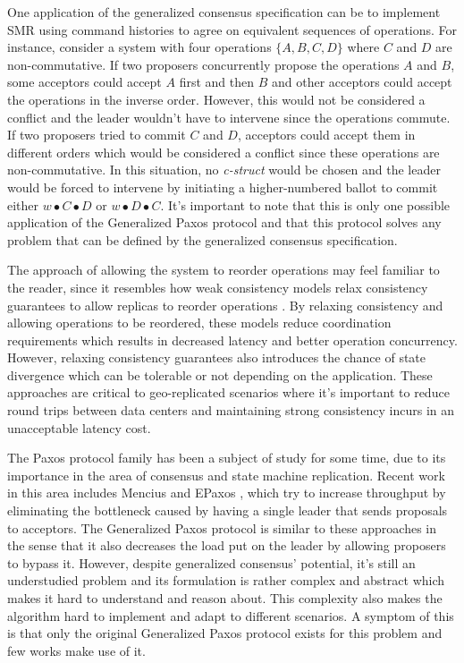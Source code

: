 \documentclass[runningheads,a4paper]{llncs}
\begin{document}
One application of the generalized consensus specification can be to implement SMR using command histories to agree on equivalent sequences of operations. For instance, consider a system with four operations $\{A, B, C, D\}$ where $C$ and $D$ are non-commutative. If two proposers concurrently propose the operations $A$ and $B$, some acceptors could accept $A$ first and then $B$ and other acceptors could accept the operations in the inverse order. However, this would not be considered a conflict and the leader wouldn't have to intervene since the operations commute. If two proposers tried to commit $C$ and $D$, acceptors could accept them in different orders which would be considered a conflict since these operations are non-commutative. In this situation, no \textit{c-struct} would be chosen and the leader would be forced to intervene by initiating a higher-numbered ballot to commit either $w \bullet C \bullet D$ or $w \bullet D \bullet C$. It's important to note that this is only one possible application of the Generalized Paxos protocol and that this protocol solves any problem that can be defined by the generalized consensus specification. \par
The approach of allowing the system to reorder operations may feel familiar to the reader, since it resembles how weak consistency models relax consistency guarantees to allow replicas to reorder operations \cite{Ladin1992}. By relaxing consistency and allowing operations to be reordered, these models reduce coordination requirements which results in decreased latency and better operation concurrency. However, relaxing consistency guarantees also introduces the chance of state divergence which can be tolerable or not depending on the application. These approaches are critical to geo-replicated scenarios where it's important to reduce round trips between data centers and maintaining strong consistency incurs in an unacceptable latency cost. \par
The Paxos protocol family has been a subject of study for some time, due to its importance in the area of consensus and state machine replication. Recent work in this area includes Mencius \cite{Mao2008} and EPaxos \cite{Moraru2013}, which try to increase throughput by eliminating the bottleneck caused by having a single leader that sends proposals to acceptors. The Generalized Paxos protocol is similar to these approaches in the sense that it also decreases the load put on the leader by allowing proposers to bypass it. However, despite generalized consensus' potential, it's still an understudied problem and its formulation is rather complex and abstract which makes it hard to understand and reason about. This complexity also makes the algorithm hard to implement and adapt to different scenarios. A symptom of this is that only the original Generalized Paxos protocol exists for this problem and few works make use of it.  \par
\end{document}
